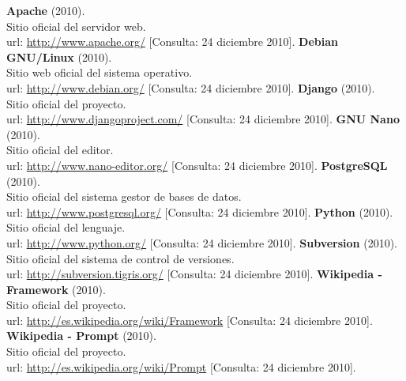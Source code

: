 \begin{thebibliography}{xx}

 \textbf{Apache} (2010).\\
        Sitio oficial del servidor web.\\
        url: \url{http://www.apache.org/}
        [Consulta: 24 diciembre 2010].
 \textbf{Debian GNU/Linux} (2010).\\
         Sitio web oficial del sistema operativo.\\
         url: \url{http://www.debian.org/}
         [Consulta: 24 diciembre 2010].
 \textbf{Django} (2010).\\
         Sitio oficial del proyecto.\\
         url: \url{http://www.djangoproject.com/}
         [Consulta: 24 diciembre 2010].
 \textbf{GNU Nano} (2010).\\
         Sitio oficial del editor.\\
         url: \url{http://www.nano-editor.org/}
         [Consulta: 24 diciembre 2010].
 \textbf{PostgreSQL} (2010).\\
         Sitio oficial del sistema gestor de bases de datos.\\
         url: \url{http://www.postgresql.org/}
         [Consulta: 24 diciembre 2010].
 \textbf{Python} (2010).\\
         Sitio oficial del lenguaje.\\
         url: \url{http://www.python.org/}
         [Consulta: 24 diciembre 2010].
 \textbf{Subversion} (2010).\\
         Sitio oficial del sistema de control de versiones.\\
         url: \url{http://subversion.tigris.org/}
         [Consulta: 24 diciembre 2010].
 \textbf{Wikipedia - Framework} (2010).\\
         Sitio oficial del proyecto.\\
         url: \url{http://es.wikipedia.org/wiki/Framework}
         [Consulta: 24 diciembre 2010].
 \textbf{Wikipedia - Prompt} (2010).\\
         Sitio oficial del proyecto.\\
         url: \url{http://es.wikipedia.org/wiki/Prompt}
         [Consulta: 24 diciembre 2010].

 \end{thebibliography}